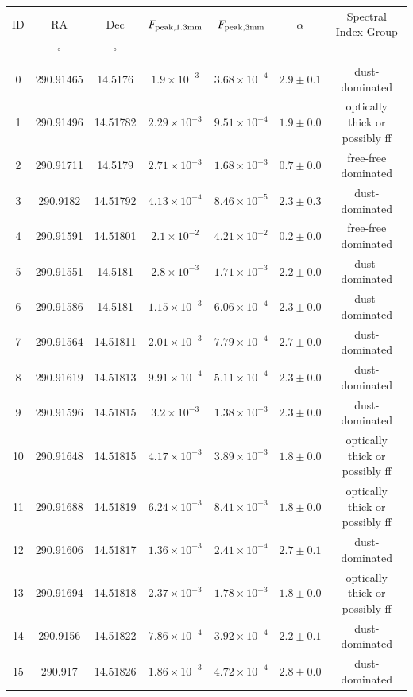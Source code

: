 \begin{table}
\begin{tabular}{ccccccc}
ID & RA & Dec & $F_{\rm peak, 1.3mm}$ & $F_{\rm peak, 3mm}$ & $\alpha$ & Spectral Index Group \\
 & $\mathrm{{}^{\circ}}$ & $\mathrm{{}^{\circ}}$ &  &  &  &  \\
0 & 290.91465 & 14.5176 & $1.9\times10^{-3}$ & $3.68\times10^{-4}$ & $2.9\pm0.1$ & dust-dominated \\
1 & 290.91496 & 14.51782 & $2.29\times10^{-3}$ & $9.51\times10^{-4}$ & $1.9\pm0.0$ & optically thick or possibly ff \\
2 & 290.91711 & 14.5179 & $2.71\times10^{-3}$ & $1.68\times10^{-3}$ & $0.7\pm0.0$ & free-free dominated \\
3 & 290.9182 & 14.51792 & $4.13\times10^{-4}$ & $8.46\times10^{-5}$ & $2.3\pm0.3$ & dust-dominated \\
4 & 290.91591 & 14.51801 & $2.1\times10^{-2}$ & $4.21\times10^{-2}$ & $0.2\pm0.0$ & free-free dominated \\
5 & 290.91551 & 14.5181 & $2.8\times10^{-3}$ & $1.71\times10^{-3}$ & $2.2\pm0.0$ & dust-dominated \\
6 & 290.91586 & 14.5181 & $1.15\times10^{-3}$ & $6.06\times10^{-4}$ & $2.3\pm0.0$ & dust-dominated \\
7 & 290.91564 & 14.51811 & $2.01\times10^{-3}$ & $7.79\times10^{-4}$ & $2.7\pm0.0$ & dust-dominated \\
8 & 290.91619 & 14.51813 & $9.91\times10^{-4}$ & $5.11\times10^{-4}$ & $2.3\pm0.0$ & dust-dominated \\
9 & 290.91596 & 14.51815 & $3.2\times10^{-3}$ & $1.38\times10^{-3}$ & $2.3\pm0.0$ & dust-dominated \\
10 & 290.91648 & 14.51815 & $4.17\times10^{-3}$ & $3.89\times10^{-3}$ & $1.8\pm0.0$ & optically thick or possibly ff \\
11 & 290.91688 & 14.51819 & $6.24\times10^{-3}$ & $8.41\times10^{-3}$ & $1.8\pm0.0$ & optically thick or possibly ff \\
12 & 290.91606 & 14.51817 & $1.36\times10^{-3}$ & $2.41\times10^{-4}$ & $2.7\pm0.1$ & dust-dominated \\
13 & 290.91694 & 14.51818 & $2.37\times10^{-3}$ & $1.78\times10^{-3}$ & $1.8\pm0.0$ & optically thick or possibly ff \\
14 & 290.9156 & 14.51822 & $7.86\times10^{-4}$ & $3.92\times10^{-4}$ & $2.2\pm0.1$ & dust-dominated \\
15 & 290.917 & 14.51826 & $1.86\times10^{-3}$ & $4.72\times10^{-4}$ & $2.8\pm0.0$ & dust-dominated \\

\end{tabular}
\end{table}
